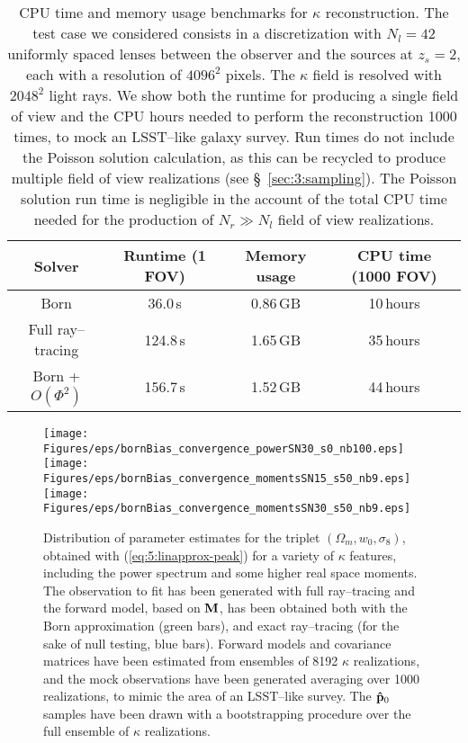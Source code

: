 \begin{table}
\begin{center}
\begin{tabular}{c|c|c|c}
\textbf{Solver} & \textbf{Runtime (1 FOV)} & \textbf{Memory usage} & \textbf{CPU time (1000 FOV)} \\ \hline \hline
Born & 36.0\,s & 0.86\,GB & 10\,hours  \\
Full ray--tracing & 124.8\,s & 1.65\,GB & 35\,hours  \\
Born + $O(\Phi^2)$ & 156.7\,s & 1.52\,GB & 44\,hours \\ \hline
\end{tabular}
\end{center}
\caption{CPU time and memory usage benchmarks for $\kappa$ reconstruction. The test case we considered consists in a discretization with $N_l=42$ uniformly spaced lenses between the observer and the sources at $z_s=2$, each with a resolution of $4096^2$ pixels. The $\kappa$ field is resolved with $2048^2$ light rays. We show both the runtime for producing a single field of view and the CPU hours needed to perform the reconstruction 1000 times, to mock an LSST--like galaxy survey. Run times do not include the Poisson solution calculation, as this can be recycled to produce multiple field of view realizations (see \S~\ref{sec:3:sampling}). The Poisson solution run time is negligible in the account of the total CPU time needed for the production of $N_r\gg N_l$ field of view realizations.}
\label{tab:7:benchmarks}
\end{table}
% 
\begin{figure}
\begin{center}
\texttt{[image: Figures/eps/bornBias\_convergence\_powerSN30\_s0\_nb100.eps]}
\texttt{[image: Figures/eps/bornBias\_convergence\_momentsSN15\_s50\_nb9.eps]}
\texttt{[image: Figures/eps/bornBias\_convergence\_momentsSN30\_s50\_nb9.eps]}
\end{center}
\caption{Distribution of parameter estimates for the triplet $(\Omega_m,w_0,\sigma_8)$, obtained with (\ref{eq:5:linapprox-peak}) for a variety of $\kappa$ features, including the power spectrum and some higher real space moments. The observation to fit has been generated with full ray--tracing and the forward model, based on $\mathbf{M}$, has been obtained both with the Born approximation (green bars), and exact ray--tracing (for the sake of null testing, blue bars). Forward models and covariance matrices have been estimated from ensembles of 8192 $\kappa$ realizations, and the mock observations have been generated averaging over 1000 realizations, to mimic the area of an LSST--like survey. The $\mathbf{\hat{p}}_0$ samples have been drawn with a bootstrapping procedure over the full ensemble of $\kappa$ realizations.}
\label{fig:7:biasfeat}
\end{figure}
